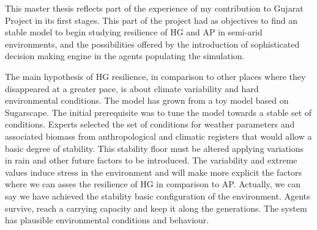 \documentclass[11pt,oneside,a4paper,openright]{report}
\begin{document}

%




This master thesis reflects part of the experience of my contribution to Gujarat Project in
its first stages. This part of the project had as objectives to find an stable model to begin
studying resilience of HG and AP in semi-arid environments, and the possibilities offered by the
introduction of sophisticated decision making engine in the agents populating the simulation.


The main hypothesis of HG resilience, in comparison to other places where they disappeared at a 
greater pace, is about climate variability and hard environmental conditions.
The model has grown from a toy model based on Sugarscape\cite{EpsteinAxtell}. The initial prerequisite
was to tune the model towards a stable set of conditions. Experts selected the set of conditions 
for weather parameters and associated biomass from anthropological and climatic registers that would 
allow a basic degree of stability. This stability floor must be altered applying variations in rain and
other future factors to be introduced. The variability and extreme values induce stress in the 
environment and will make more explicit the factors where we can asses the resilience of HG in comparison
to AP. Actually, we can say we have achieved the stability basic configuration of the environment. 
Agents survive, reach a carrying capacity and keep it along the generations. The system has plausible 
environmental conditions and behaviour.
\end{document}
